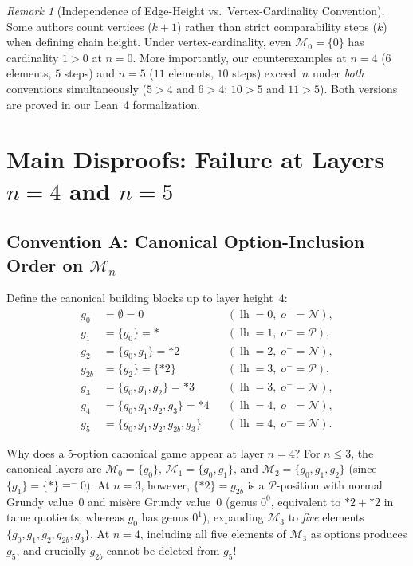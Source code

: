 \documentclass[11pt]{amsart}
\theoremstyle{definition}
\theoremstyle{remark}
\newtheorem{remark}[theorem]{Remark}
\newcommand{\Npos}{\mathcal{N}}
\newcommand{\Ppos}{\mathcal{P}}
\newcommand{\Mlayer}{\mathcal{M}}
\DeclareMathOperator{\lh}{lh}
\begin{document}
\begin{remark}[Independence of Edge-Height vs.\ Vertex-Cardinality Convention]
Some authors count vertices ($k+1$) rather than strict comparability steps ($k$) when defining chain height. Under vertex-cardinality, even $\Mlayer_0 = \{0\}$ has cardinality $1 > 0$ at $n = 0$. More importantly, our counterexamples at $n = 4$ ($6$ elements, $5$ steps) and $n = 5$ ($11$ elements, $10$ steps) exceed~$n$ under \emph{both} conventions simultaneously ($5 > 4$ and $6 > 4$; $10 > 5$ and $11 > 5$). Both versions are proved in our Lean~4 formalization.
\end{remark}

\section{Main Disproofs: Failure at Layers \texorpdfstring{$n = 4$}{n = 4} and \texorpdfstring{$n = 5$}{n = 5}}

\subsection{Convention A: Canonical Option-Inclusion Order on \texorpdfstring{$\Mlayer_n$}{M\_n}}

Define the canonical building blocks up to layer height~$4$:
\begin{align*}
  g_0 &= \emptyset = 0 && (\lh = 0,\; o^- = \Npos),\\
  g_1 &= \{g_0\} = * && (\lh = 1,\; o^- = \Ppos),\\
  g_2 &= \{g_0, g_1\} = *2 && (\lh = 2,\; o^- = \Npos),\\
  g_{2b} &= \{g_2\} = \{*2\} && (\lh = 3,\; o^- = \Ppos),\\
  g_3 &= \{g_0, g_1, g_2\} = *3 && (\lh = 3,\; o^- = \Npos),\\
  g_4 &= \{g_0, g_1, g_2, g_3\} = *4 && (\lh = 4,\; o^- = \Npos),\\
  g_5 &= \{g_0, g_1, g_2, g_{2b}, g_3\} && (\lh = 4,\; o^- = \Npos).
\end{align*}

Why does a $5$-option canonical game appear at layer $n = 4$? For $n \le 3$, the canonical layers are $\Mlayer_0 = \{g_0\}$, $\Mlayer_1 = \{g_0, g_1\}$, and $\Mlayer_2 = \{g_0, g_1, g_2\}$ (since $\{g_1\} = \{*\} \equiv^- 0$). At $n = 3$, however, $\{*2\} = g_{2b}$ is a $\Ppos$-position with normal Grundy value~$0$ and mis\`ere Grundy value~$0$ (genus $0^0$, equivalent to $*2 + *2$ in tame quotients, whereas $g_0$ has genus $0^1$), expanding $\Mlayer_3$ to \emph{five} elements $\{g_0, g_1, g_2, g_{2b}, g_3\}$. At $n = 4$, including all five elements of $\Mlayer_3$ as options produces $g_5$, and crucially $g_{2b}$ cannot be deleted from $g_5$!
\end{document}
